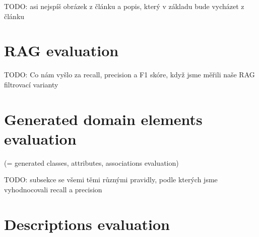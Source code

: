 TODO: asi nejspíš obrázek z článku a popis, který v základu bude vycházet z článku

\section{RAG evaluation}

TODO: Co nám vyšlo za recall, precision a F1 skóre, když jsme měřili naše RAG filtrovací varianty \\


\section{Generated domain elements evaluation}
(= generated classes, attributes, associations evaluation)

TODO: subsekce se všemi těmi různými pravidly, podle kterých jsme vyhodnocovali recall a precision \\

\section{Descriptions evaluation}
